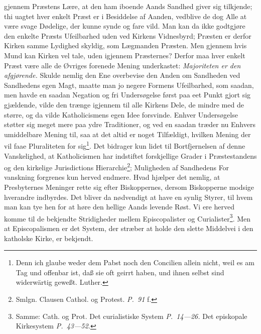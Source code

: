 \documentclass[12pt]{book}
\newcommand{\opage}[1]{\marginnote{\footnotesize\textit{[#1]}}}
\begin{document}
gjennem Præstens Lære, at den ham iboende Aands Sandhed giver sig tilkjende; thi
uagtet hver enkelt Præst er i Besiddelse af Aanden, vedblive de dog Alle at være
svage Dødelige, der kunne synde og fare vild. Man kan da ikke godtgjøre den
enkelte Præsts Ufeilbarhed uden ved Kirkens Vidnesbyrd; Præsten er derfor Kirken
samme Lydighed skyldig, som Lægmanden Præsten. Men gjennem hvis Mund kan Kirken
vel tale, uden igjennem Præsternes? Derfor maa hver enkelt Præst være alle de
Øvriges forenede Mening underkastet: \emph{Majoriteten er den afgjørende.} Skulde
nemlig den Ene overbevise den Anden om Sandheden ved Sandhedens egen Magt, maatte
man jo negere Formens Ufeilbarhed, som saadan, men havde en saadan Negation og
fri Undersøgelse først paa eet Punkt gjort sig gjældende, vilde den trænge
igjennem til alle Kirkens Dele, de mindre med de større, og da vilde
Katholicismens egen Idee forsvinde. Enhver Undersøgelse støtter sig meget mere
paa ydre Traditioner, og ved en saadan træder nu Enhvers umiddelbare Mening til,
saa at det altid er noget Tilfældigt, hvilken Mening der vil faae Pluraliteten
for sig\footnote{Denn ich glaube weder dem Pabst noch den Concilien allein nicht,
weil es am Tag und offenbar ist, daß sie oft geirrt haben, und ihnen selbst sind
widerwärtig geweßt. Luther.}. Det bidrager kun lidet til Bortfjernelsen af denne
Vanskelighed, at Katholicismen har indstiftet forskjellige Grader i
Præstestandens og den kirkelige Jurisdictions Hierarchie\footnote{Smlgn. Clausen
Cathol. og Protest. \textit{P.\ 91} f.}; Muligheden af Sandhedens For\-%
\opage{59}\setcounter{footnote}{0}%
vanskning forgrenes kun herved endmere. Hvad hjælper det nemlig, at Presbyternes
Meninger rette sig efter Biskoppernes, dersom Biskopperne modsige hverandre
indbyrdes. Det bliver da nødvendigt at have en synlig Styrer, til hvem man kan
tye hen for at høre den hellige Aands levende Røst. Vi ere herved komme til de
bekjendte Stridigheder mellem Episcopalister og Curialister\footnote{Samme: Cath.
og Prot. Det curialistiske System \textit{P.\ 14---26.} Det episkopale
Kirkesystem \textit{P.\ 43---52.}}. Men at Episcopalismen er det System, der
stræber at holde den slette Middelvei i den katholske Kirke, er bekjendt.
\end{document}
